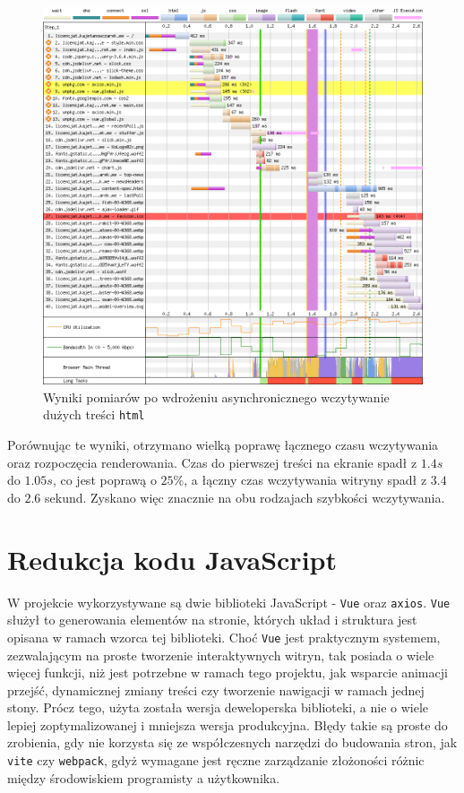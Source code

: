 \documentclass[licencjacka]{pracadypl}
\begin{document}
\begin{figure}[H]
  \centering
  \includegraphics[width=\linewidth]{images/waterfall-after-async-html.png}
  \caption{Wyniki pomiarów po wdrożeniu asynchronicznego wczytywanie dużych treści \texttt{html}}
  \label{fig:waterfall-after-async-html}
\end{figure}

Porównując te wyniki, otrzymano wielką poprawę łącznego czasu wczytywania oraz rozpoczęcia renderowania. Czas do pierwszej treści na ekranie spadł z $1.4s$ do $1.05s$, co jest poprawą o $25\%$, a łączny czas wczytywania witryny spadł z $3.4$ do $2.6$ sekund. Zyskano więc znacznie na obu rodzajach szybkości wczytywania.

\section{Redukcja kodu JavaScript}

W projekcie wykorzystywane są dwie biblioteki JavaScript - \texttt{Vue} oraz \texttt{axios}. \texttt{Vue} służył to generowania elementów na stronie, których układ i struktura jest opisana w ramach wzorca tej biblioteki. Choć \texttt{Vue} jest praktycznym systemem, zezwalającym na proste tworzenie interaktywnych witryn, tak posiada o wiele więcej funkcji, niż jest potrzebne w ramach tego projektu, jak wsparcie animacji przejść, dynamicznej zmiany treści czy tworzenie nawigacji w ramach jednej stony. Prócz tego, użyta została wersja deweloperska biblioteki, a nie o wiele lepiej zoptymalizowanej i mniejsza wersja produkcyjna. Błędy takie są proste do zrobienia, gdy nie korzysta się ze współczesnych narzędzi do budowania stron, jak \texttt{vite} czy \texttt{webpack}, gdyż wymagane jest ręczne zarządzanie złożoności różnic między środowiskiem programisty a użytkownika. 
\end{document}
